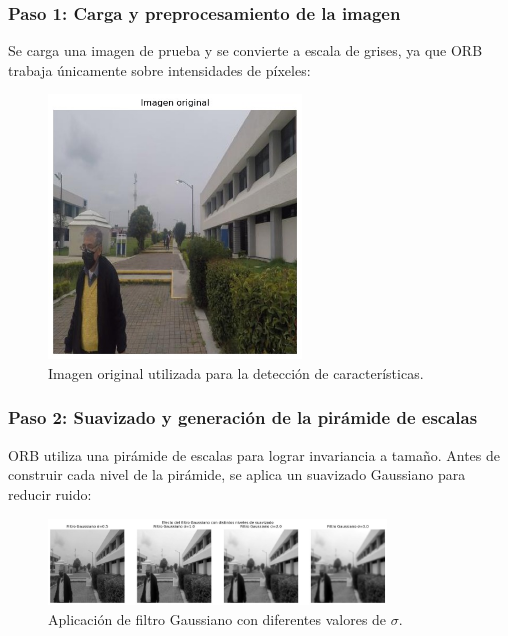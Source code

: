 \documentclass[a4paper]{article}
\begin{document}
\subsubsection*{Paso 1: Carga y preprocesamiento de la imagen}

Se carga una imagen de prueba y se convierte a escala de grises, ya que ORB trabaja únicamente sobre intensidades de píxeles:

\begin{figure}[H]
    \centering
    \includegraphics[width=0.6\textwidth]{images/original.jpg}
    \caption{Imagen original utilizada para la detección de características.}
\end{figure}

\subsubsection*{Paso 2: Suavizado y generación de la pirámide de escalas}

ORB utiliza una pirámide de escalas para lograr invariancia a tamaño. Antes de construir cada nivel de la pirámide, se aplica un suavizado Gaussiano para reducir ruido:

\begin{figure}[H]
    \centering
    \includegraphics[width=0.8\textwidth]{images/gaussian_blur.jpg}
    \caption{Aplicación de filtro Gaussiano con diferentes valores de $\sigma$.}
\end{figure}
\end{document}
